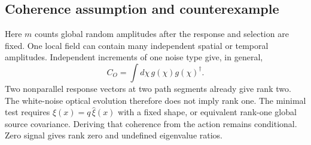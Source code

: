 \subsection{Coherence assumption and counterexample}
Here $m$ counts global random amplitudes after the response and selection
are fixed. One local field can contain many independent spatial or temporal
amplitudes. Independent increments of one noise type give, in general,
\[
C_O=\int d\chi\,g(\chi)g(\chi)^\dagger.
\]
Two nonparallel response vectors at two path segments already give rank two.
The white-noise optical evolution therefore does not imply rank one.
The minimal test requires $\xi(x)=q\,\widehat\xi(x)$ with a fixed shape,
or equivalent rank-one global source covariance. Deriving that coherence
from the action remains conditional. Zero signal gives rank zero and
undefined eigenvalue ratios.
